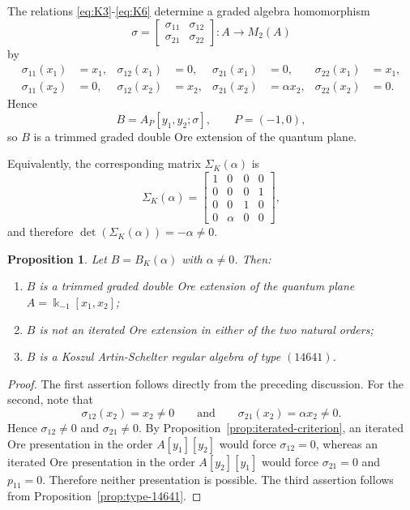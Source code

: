 \documentclass[reqno]{amsart}
\numberwithin{equation}{section}
\newtheorem{proposition}[theorem]{Proposition}
\theoremstyle{definition}
\begin{document}
The relations \eqref{eq:K3}-\eqref{eq:K6} determine a graded algebra homomorphism
\[
\sigma=
\begin{bmatrix}
\sigma_{11} & \sigma_{12}\\
\sigma_{21} & \sigma_{22}
\end{bmatrix}:A\to M_2(A)
\]
by
\begin{align*}
\sigma_{11}(x_1)&=x_1, & \sigma_{12}(x_1)&=0, &
\sigma_{21}(x_1)&=0, & \sigma_{22}(x_1)&=x_1,\\
\sigma_{11}(x_2)&=0, & \sigma_{12}(x_2)&=x_2, &
\sigma_{21}(x_2)&=\alpha x_2, & \sigma_{22}(x_2)&=0.
\end{align*}
Hence
\[
B=A_P[y_1,y_2;\sigma],
\qquad
P=(-1,0),
\]
so \(B\) is a trimmed graded double Ore extension of the quantum plane.

Equivalently, the corresponding matrix \(\Sigma_K(\alpha)\) is
\[
\Sigma_K(\alpha)=
\begin{bmatrix}
1 & 0 & 0 & 0\\
0 & 0 & 0 & 1\\
0 & 0 & 1 & 0\\
0 & \alpha & 0 & 0
\end{bmatrix},
\]
and therefore \(\det(\Sigma_K(\alpha))=-\alpha\neq 0\).

\begin{proposition}\label{prop:BK-basic}
Let \(B=B_K(\alpha)\) with \(\alpha\neq 0\). Then:
\begin{enumerate}[label=\rm (\arabic*)]
    \item \(B\) is a trimmed graded double Ore extension of the quantum plane \(A=\Bbbk_{-1}[x_1,x_2]\);
    \item \(B\) is not an iterated Ore extension in either of the two natural orders;
    \item \(B\) is a Koszul Artin-Schelter regular algebra of type \((14641)\).
\end{enumerate}
\end{proposition}

\begin{proof}
The first assertion follows directly from the preceding discussion. For the second, note that
\[
\sigma_{12}(x_2)=x_2\neq 0
\qquad\text{and}\qquad
\sigma_{21}(x_2)=\alpha x_2\neq 0.
\]
Hence \(\sigma_{12}\neq 0\) and \(\sigma_{21}\neq 0\). By Proposition~\ref{prop:iterated-criterion}, an iterated Ore presentation in the order \(A[y_1][y_2]\) would force \(\sigma_{12}=0\), whereas an iterated Ore presentation in the order \(A[y_2][y_1]\) would force \(\sigma_{21}=0\) and \(p_{11}=0\). Therefore neither presentation is possible. The third assertion follows from Proposition~\ref{prop:type-14641}.
\end{proof}
\end{document}
